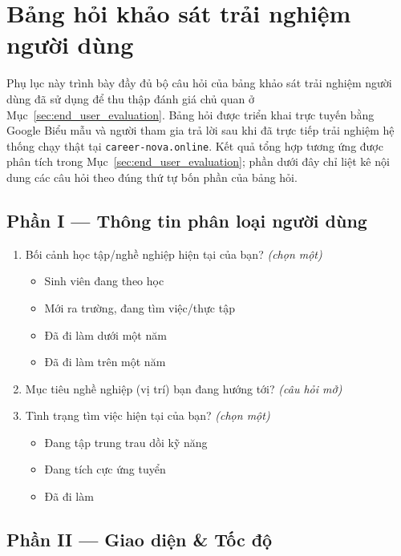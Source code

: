 \chapter{Bảng hỏi khảo sát trải nghiệm người dùng}
\label{Appendix:survey}

Phụ lục này trình bày đầy đủ bộ câu hỏi của bảng khảo sát trải nghiệm người dùng đã sử dụng để thu thập đánh giá chủ quan ở Mục~\ref{sec:end_user_evaluation}. Bảng hỏi được triển khai trực tuyến bằng Google Biểu mẫu và người tham gia trả lời sau khi đã trực tiếp trải nghiệm hệ thống chạy thật tại \texttt{career-nova.online}. Kết quả tổng hợp tương ứng được phân tích trong Mục~\ref{sec:end_user_evaluation}; phần dưới đây chỉ liệt kê nội dung các câu hỏi theo đúng thứ tự bốn phần của bảng hỏi.

\section*{Phần I --- Thông tin phân loại người dùng}

\begin{enumerate}
    \item Bối cảnh học tập/nghề nghiệp hiện tại của bạn? \textit{(chọn một)}
    \begin{itemize}
        \item Sinh viên đang theo học
        \item Mới ra trường, đang tìm việc/thực tập
        \item Đã đi làm dưới một năm
        \item Đã đi làm trên một năm
    \end{itemize}
    \item Mục tiêu nghề nghiệp (vị trí) bạn đang hướng tới? \textit{(câu hỏi mở)}
    \item Tình trạng tìm việc hiện tại của bạn? \textit{(chọn một)}
    \begin{itemize}
        \item Đang tập trung trau dồi kỹ năng
        \item Đang tích cực ứng tuyển
        \item Đã đi làm
    \end{itemize}
\end{enumerate}

\section*{Phần II --- Giao diện \& Tốc độ}

